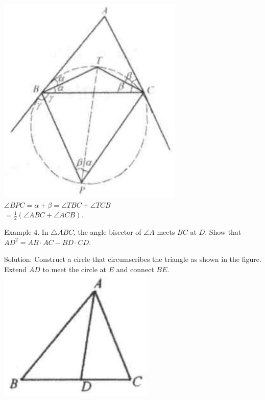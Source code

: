 \documentclass[10pt]{article}
\begin{document}
\includegraphics[max width=\textwidth, center]{2025_04_17_97bc1f7e44d93c271a88g-195(1)}\\
\(\angle B P C=\alpha+\beta=\angle T B C+\angle T C B\)\\
\(=\frac{1}{2}(\angle A B C+\angle A C B)\).


Example 4. In \(\triangle A B C\), the angle bisector of \(\angle A\) meets \(B C\) at \(D\). Show that \(A D^{2}=A B \cdot A C-B D \cdot C D\).

Solution:
Construct a circle that circumscribes the triangle as shown in the figure. Extend \(A D\) to meet the circle at \(E\) and connect \(B E\).\\
\includegraphics[max width=\textwidth, center]{2025_04_17_97bc1f7e44d93c271a88g-196}
\end{document}

